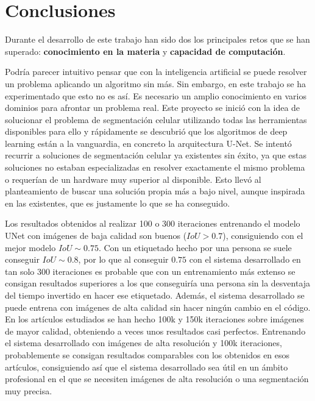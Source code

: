 \chapter{Conclusiones}\label{pruebas}

Durante el desarrollo de este trabajo han sido dos los principales retos que se han superado: \textbf{conocimiento en la materia} y \textbf{capacidad de computación}.

Podría parecer intuitivo pensar que con la inteligencia artificial se puede resolver un problema aplicando un algoritmo sin más. Sin embargo, en este trabajo se ha experimentado que esto no es así. Es necesario un amplio conocimiento en varios dominios para afrontar un problema real. Este proyecto se inició con la idea de solucionar el problema de segmentación celular utilizando todas las herramientas disponibles para ello y rápidamente se descubrió que los algoritmos de deep learning están a la vanguardia, en concreto la arquitectura U-Net. Se intentó recurrir a soluciones de segmentación celular ya existentes sin éxito, ya que estas soluciones no estaban especializadas en resolver exactamente el mismo problema o requerían de un hardware muy superior al disponible. Esto llevó al planteamiento de buscar una solución propia más a bajo nivel, aunque inspirada en las existentes, que es justamente lo que se ha conseguido.

Los resultados obtenidos al realizar 100 o 300 iteraciones entrenando el modelo UNet con imágenes de baja calidad son buenos ($IoU>0.7$), consiguiendo con el mejor modelo $IoU\sim0.75$. Con un etiquetado hecho por una persona se suele conseguir $IoU\sim0.8$, por lo que al conseguir $0.75$ con el sistema desarrollado en tan solo 300 iteraciones es probable que con un entrenamiento más extenso se consigan resultados superiores a los que conseguiría una persona sin la desventaja del tiempo invertido en hacer ese etiquetado. Además, el sistema desarrollado se puede entrena con imágenes de alta calidad sin hacer ningún cambio en el código. En los artículos estudiados se han hecho 100k y 150k iteraciones sobre imágenes de mayor calidad, obteniendo a veces unos resultados casi perfectos. Entrenando el sistema desarrollado con imágenes de alta resolución y 100k iteraciones, probablemente se consigan resultados comparables con los obtenidos en esos artículos, consiguiendo así que el sistema desarrollado sea útil en un ámbito profesional en el que se necesiten imágenes de alta resolución o una segmentación muy precisa.


